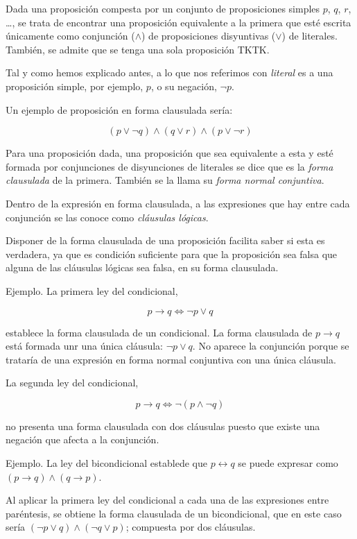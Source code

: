 


Dada una proposición compesta por un conjunto de proposiciones simples $p$,
$q$, $r$, \ldots, se trata de encontrar una proposición equivalente a la
primera que esté escrita únicamente como conjunción ($\land$) de
proposiciones disyuntivas ($\lor$) de literales. También, se admite que se
tenga una sola proposición TKTK.

Tal y como hemos explicado antes, a lo que nos referimos con \emph{literal}
es a una proposición simple, por ejemplo, $p$, o su negación, $\neg p$.

Un ejemplo de proposición en forma clausulada sería:

$$ (p \lor \neg q) \land (q \lor r) \land (p \lor \neg r) $$

Para una proposición dada, una proposición que sea equivalente a esta y esté
formada por conjunciones de disyunciones de literales se dice que es la
\emph{forma clausulada} de la primera. También se la llama su \emph{forma
normal conjuntiva}.

Dentro de la expresión en forma clausulada, a las expresiones que hay entre
cada conjunción se las conoce como \emph{cláusulas lógicas}.

Disponer de la forma clausulada de una proposición facilita saber si esta es
verdadera, ya que es condición suficiente para que la proposición sea falsa
que alguna de las cláusulas lógicas sea falsa, en su forma clausulada.

Ejemplo. La primera ley del condicional,

$$ p \to q \iff \neg p \lor q $$

\noindent establece la forma clausulada de un condicional. La forma
clausulada de $p \to q$ está formada unr una única cláusula: $\neg p \lor
q$. No aparece la conjunción porque se trataría de una expresión en forma
normal conjuntiva con una única cláusula.

La segunda ley del condicional,

$$ p \to q \iff \neg(p \land \neg q) $$

\noindent no presenta una forma clausulada con dos cláusulas puesto que
existe una negación que afecta a la conjunción.


Ejemplo. La ley del bicondicional establede que $p \leftrightarrow q$ se
puede expresar como $(p \to q) \land (q \to p)$.

Al aplicar la primera ley del condicional a cada una de las expresiones
entre paréntesis, se obtiene la forma clausulada de un bicondicional, que en
este caso sería $(\neg p \lor q) \land (\neg q \lor p)$; compuesta por dos
cláusulas.





